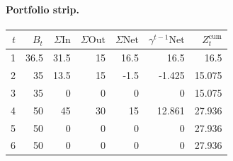 \documentclass[12pt, a4paper]{article}
\begin{document}
\paragraph{Portfolio strip.}
\begin{center}
\begin{tabular}{rrrrrrr}
\toprule
$t$ & $B_t$ & $\Sigma\mathrm{In}$ & $\Sigma\mathrm{Out}$ & $\Sigma\mathrm{Net}$ & $\gamma^{t-1}\mathrm{Net}$ & $Z_t^{\mathrm{cum}}$\\
\midrule
1 & 36.5 & 31.5 & 15 & 16.5 & 16.5 & 16.5 \\
2 & 35 & 13.5 & 15 & -1.5 & -1.425 & 15.075 \\
3 & 35 & 0 & 0 & 0 & 0 & 15.075 \\
4 & 50 & 45 & 30 & 15 & 12.861 & 27.936 \\
5 & 50 & 0 & 0 & 0 & 0 & 27.936 \\
6 & 50 & 0 & 0 & 0 & 0 & 27.936 \\
\bottomrule
\end{tabular}
\end{center}
\end{document}
